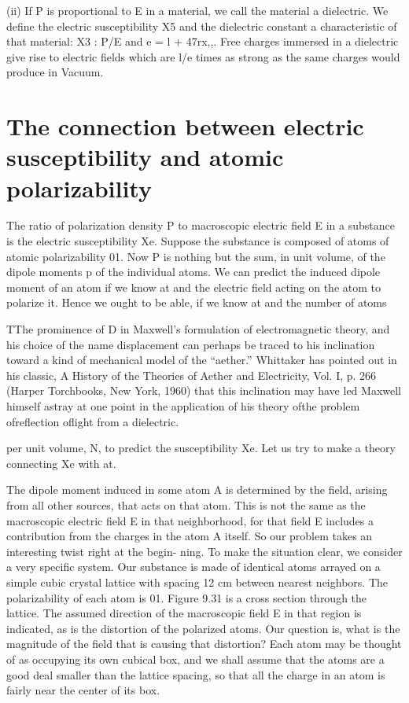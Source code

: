 {{{(ii) If P is proportional to E in a material, we call the material
a dielectric. We define the electric susceptibility X5 and the
dielectric constant a characteristic of that material:
X3 : P/E and e = l + 47rx,,. Free charges immersed in
a dielectric give rise to electric fields which are l/e times
as strong as the same charges would produce in Vacuum.

\section{The connection between electric susceptibility and atomic polarizability}

The ratio of polarization density P to macroscopic electric field E
in a substance is the electric susceptibility Xe. Suppose the substance
is composed of atoms of atomic polarizability 01. Now P is nothing
but the sum, in unit volume, of the dipole moments p of the individual
atoms. We can predict the induced dipole moment of an atom if
we know at and the electric field acting on the atom to polarize it.
Hence we ought to be able, if we know at and the number of atoms

TThe prominence of D in Maxwell's formulation of electromagnetic theory, and his
choice of the name displacement can perhaps be traced to his inclination toward a
kind of mechanical model of the ``aether.'' Whittaker has pointed out in his classic,
A History of the Theories of Aether and Electricity, Vol. I, p. 266 (Harper Torchbooks,
New York, 1960) that this inclination may have led Maxwell himself astray at one
point in the application of his theory ofthe problem ofreflection oflight from a dielectric.

 
 

 

per unit volume, N, to predict the susceptibility Xe. Let us try to
make a theory connecting Xe with at.

The dipole moment induced in some atom A is determined by the
field, arising from all other sources, that acts on that atom. This is
not the same as the macroscopic electric field E in that neighborhood,
for that field E includes a contribution from the charges in the atom A
itself. So our problem takes an interesting twist right at the begin-
ning. To make the situation clear, we consider a very specific system.
Our substance is made of identical atoms arrayed on a simple cubic
crystal lattice with spacing 12 cm between nearest neighbors. The
polarizability of each atom is 01. Figure 9.31 is a cross section
through the lattice. The assumed direction of the macroscopic field
E in that region is indicated, as is the distortion of the polarized
atoms. Our question is, what is the magnitude of the field that is
causing that distortion? Each atom may be thought of as occupying
its own cubical box, and we shall assume that the atoms are a good
deal smaller than the lattice spacing, so that all the charge in an atom
is fairly near the center of its box.

}}}
